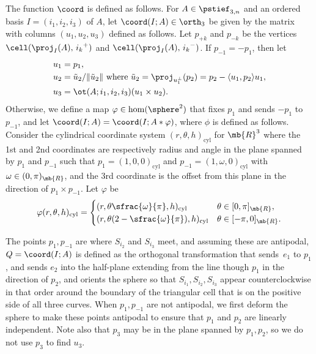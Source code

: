 The function $\coord$ is defined as follows.
For $A\in \pstief_{3,n}$ and an ordered basis $I = (i_1,i_2,i_3)$ of $A$,
let $\coord(I;A)\in \orth_3$ be given by the matrix with columns $(u_1,u_2,u_3)$ defined as follows.
Let $p_{+k}$ and $p_{-k}$ be the vertices $\cell(\proj_I(A),\, {i_k}^+)$ and $\cell(\proj_I(A),\, {i_k}^-)$.
If $p_{- 1} = -p_{1}$, then let
\begin{align*}
u_1 &= p_1, \\
u_2 &= \tilde u_2/ \|\tilde u_2\| \text{ where } \tilde u_2 = \proj_{u_1^{\perp}}(p_2) = {p_2 -\langle u_1, p_2 \rangle u_1}, \\
u_3 &= \ot(A;i_1,i_2,i_3) ( u_1 \times u_2).
\end{align*}
Otherwise, we define a map $\varphi \in \hom(\sphere^2)$ that fixes $p_1$ and sends $-p_{1}$ to $p_{-1}$, and let $\coord(I;A) = \coord(I;A * \varphi)$, where $\phi$ is defined as follows.
Consider the cylindrical coordinate system $(r,\theta,h)_\mathrm{cyl}$ for $\mb{R}^3$ where the 1st and 2nd coordinates are respectively radius and angle in the plane spanned by $p_1$ and $p_{-1}$ such that $p_1 =(1,0,0)_\mathrm{cyl}$ and $p_{-1} = (1,\omega,0)_\mathrm{cyl}$ with $\omega \in (0,\pi)_\mb{R}$, and the 3rd coordinate is the offset from this plane in the direction of $p_1 \times p_{-1}$. Let $\varphi$ be
\[ \varphi(r,\theta,h)_\mathrm{cyl} = \begin{cases} (r,\theta \sfrac{\omega}{\pi},h)_\mathrm{cyl} & \theta \in [0,\pi]_\mb{R}, \\ (r,\theta (2-\sfrac{\omega}{\pi}),h)_\mathrm{cyl} & \theta \in [-\pi,0]_\mb{R}. \end{cases} \]

\begin{remark}
The points $p_{1},p_{-1}$ are where $S_{i_2}$ and $S_{i_3}$ meet, and assuming these are antipodal, $Q = \coord(I;A)$ is defined as the orthogonal transformation that sends~$e_{1}$ to $p_1$, and sends $e_2$ into the half-plane extending from the line though $p_1$ in the direction of $p_2$, and orients the sphere so that $S_{i_1},S_{i_2},S_{i_3}$ appear counterclockwise in that order around the boundary of the triangular cell that is on the positive side of all three curves.
When $p_{1},p_{-1}$ are not antipodal, we first deform the sphere to make these points antipodal to ensure that $p_1$ and $p_2$ are linearly independent.
Note also that $p_3$ may be in the plane spanned by $p_1,p_2$, so we do not use $p_3$ to find $u_3$.
\end{remark}

